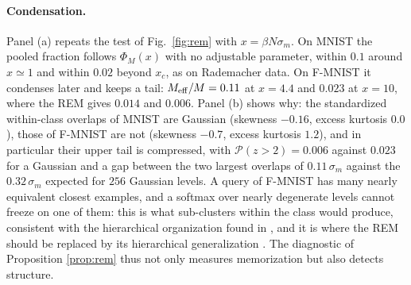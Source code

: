 \documentclass[11pt,a4paper]{article}
\newcommand{\Meff}{M_{\rm eff}}
\begin{document}
\paragraph{Condensation.} Panel (a) repeats the test of Fig.\ \ref{fig:rem} with $x=\beta N\sigma_m$. On MNIST the pooled fraction follows $\Phi_M(x)$ with no adjustable parameter, within $0.1$ around $x\simeq1$ and within $0.02$ beyond $x_c$, as on Rademacher data. On F-MNIST it condenses later and keeps a tail: $\Meff/M=0.11$ at $x=4.4$ and $0.023$ at $x=10$, where the REM gives $0.014$ and $0.006$. Panel (b) shows why: the standardized within-class overlaps of MNIST are Gaussian (skewness $-0.16$, excess kurtosis $0.0$), those of F-MNIST are not (skewness $-0.7$, excess kurtosis $1.2$), and in particular their upper tail is compressed, with $\mathcal P(z>2)=0.006$ against $0.023$ for a Gaussian and a gap between the two largest overlaps of $0.11\,\sigma_m$ against the $0.32\,\sigma_m$ expected for $256$ Gaussian levels. A query of F-MNIST has many nearly equivalent closest examples, and a softmax over nearly degenerate levels cannot freeze on one of them: this is what sub-clusters within the class would produce, consistent with the hierarchical organization found in \cite{Alemanno2023}, and it is where the REM should be replaced by its hierarchical generalization \cite{Derrida1985,DerridaGardner1986}. The diagnostic of Proposition \ref{prop:rem} thus not only measures memorization but also detects structure.
\end{document}
